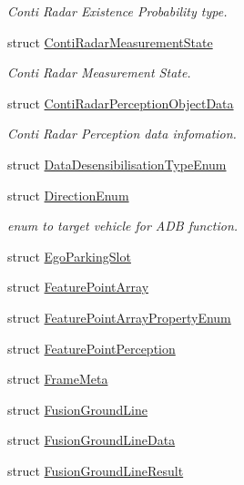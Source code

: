 \begin{DoxyCompactItemize}
\begin{DoxyCompactList}\small\item\em Conti Radar Existence Probability type. \end{DoxyCompactList}\item 
struct \hyperlink{structmaf__perception__interface_1_1ContiRadarMeasurementState}{Conti\+Radar\+Measurement\+State}
\begin{DoxyCompactList}\small\item\em Conti Radar Measurement State. \end{DoxyCompactList}\item 
struct \hyperlink{structmaf__perception__interface_1_1ContiRadarPerceptionObjectData}{Conti\+Radar\+Perception\+Object\+Data}
\begin{DoxyCompactList}\small\item\em Conti Radar Perception data infomation. \end{DoxyCompactList}\item 
struct \hyperlink{structmaf__perception__interface_1_1DataDesensibilisationTypeEnum}{Data\+Desensibilisation\+Type\+Enum}
\item 
struct \hyperlink{structmaf__perception__interface_1_1DirectionEnum}{Direction\+Enum}
\begin{DoxyCompactList}\small\item\em enum to target vehicle for A\+DB function. \end{DoxyCompactList}\item 
struct \hyperlink{structmaf__perception__interface_1_1EgoParkingSlot}{Ego\+Parking\+Slot}
\item 
struct \hyperlink{structmaf__perception__interface_1_1FeaturePointArray}{Feature\+Point\+Array}
\item 
struct \hyperlink{structmaf__perception__interface_1_1FeaturePointArrayPropertyEnum}{Feature\+Point\+Array\+Property\+Enum}
\item 
struct \hyperlink{structmaf__perception__interface_1_1FeaturePointPerception}{Feature\+Point\+Perception}
\item 
struct \hyperlink{structmaf__perception__interface_1_1FrameMeta}{Frame\+Meta}
\item 
struct \hyperlink{structmaf__perception__interface_1_1FusionGroundLine}{Fusion\+Ground\+Line}
\item 
struct \hyperlink{structmaf__perception__interface_1_1FusionGroundLineData}{Fusion\+Ground\+Line\+Data}
\item 
struct \hyperlink{structmaf__perception__interface_1_1FusionGroundLineResult}{Fusion\+Ground\+Line\+Result}

\end{DoxyCompactItemize}
